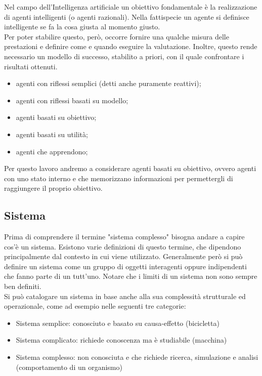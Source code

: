 \documentclass[12pt]{article}
\begin{document}
Nel campo dell’Intelligenza artificiale un obiettivo fondamentale è la realizzazione di agenti intelligenti (o agenti razionali). Nella fattispecie un agente si definisce intelligente se fa la cosa giusta al momento giusto. \\
Per poter stabilire questo, però, occorre fornire una qualche misura delle prestazioni e definire come e quando eseguire la valutazione. Inoltre, questo rende necessario un modello di successo, stabilito a priori, con il quale confrontare i risultati ottenuti. \cite{AgenteIntelligente}

\label{Agente}
\begin{itemize}
\item agenti con riflessi semplici (detti anche puramente reattivi);
\item agenti con riflessi basati su modello;
\item agenti basati su obiettivo;
\item agenti basati su utilità;
\item agenti che apprendono;
\end{itemize}

\noindent Per questo lavoro andremo a considerare agenti basati su obiettivo, ovvero agenti con uno stato interno e che memorizzano informazioni per permettergli di raggiungere il proprio obiettivo. 

\subsection{Sistema}
Prima di comprendere il termine "sistema complesso" bisogna andare a capire cos'è un sistema. Esistono varie definizioni di questo termine, che dipendono principalmente dal contesto in cui viene utilizzato. Generalmente però si può definire un sistema come un gruppo di oggetti interagenti oppure indipendenti che fanno parte di un tutt'uno. Notare che i limiti di un sistema non sono sempre ben definiti.\\
Si può catalogare un sistema in base anche alla sua complessità strutturale ed operazionale, come ad esempio nelle seguenti tre categorie:
\begin{itemize}
\item Sistema semplice: conosciuto e basato su causa-effetto (bicicletta)
\item Sistema complicato: richiede conoscenza ma è studiabile (macchina)
\item Sistema complesso: non conosciuta e che richiede ricerca, simulazione e analisi (comportamento di un organismo)
\end{itemize}
\end{document}
